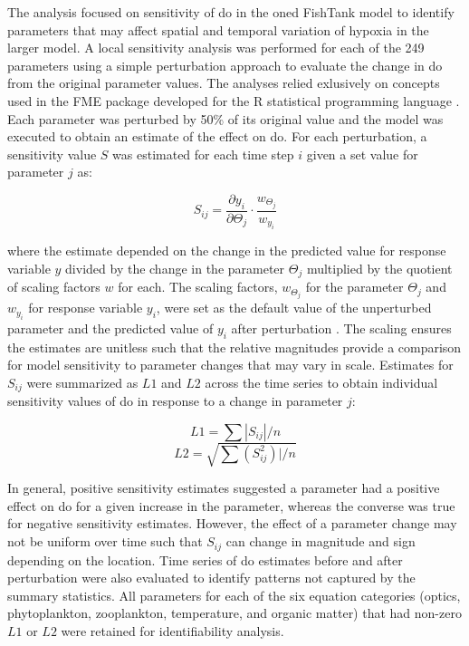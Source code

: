\documentclass[letterpaper,12pt,oneside]{article}\usepackage[]{graphicx}\usepackage[]{color}
\begin{document}
The analysis focused on sensitivity of \ac{do} in the \ac{oned} FishTank model to identify parameters that may affect spatial and temporal variation of hypoxia in the larger model.  A local sensitivity analysis was performed for each of the 249 parameters using a simple perturbation approach to evaluate the change in \ac{do} from the original parameter values.  The analyses relied exlusively on concepts used in the FME package developed for the R statistical programming language \citep{Soetaert10}. Each parameter was perturbed by 50\% of its original value and the model was executed to obtain an estimate of the effect on \ac{do}.  For each perturbation, a sensitivity value $S$ was estimated for each time step $i$ given a set value for parameter $j$ as:

\begin{equation} \label{sijeqn}
S_{ij} = \frac{\partial y_i}{\partial \Theta_j}\cdot\frac{w_{\Theta_j}}{w_{y_i}}
\end{equation}

\noindent where the estimate depended on the change in the predicted value for response variable $y$ divided by the change in the parameter $\Theta_j$ multiplied by the quotient of scaling factors $w$ for each.  The scaling factors, $w_{\Theta_j}$ for the parameter $\Theta_j$ and $w_{y_i}$ for response variable $y_i$, were set as the default value of the unperturbed parameter and the predicted value of $y_i$ after perturbation \citep{Soetaert10}.  The scaling ensures the estimates are unitless such that the relative magnitudes provide a comparison for model sensitivity to parameter changes that may vary in scale.  Estimates for $S_{ij}$ were summarized as $L1$ and $L2$ across the time series to obtain individual sensitivity values of \ac{do} in response to a change in parameter $j$:

\begin{equation} \label{l1}
L1 = \sum|S_{ij}|/n
\end{equation}
\begin{equation} \label{l2}
L2 = \sqrt{\sum\left(S_{ij}^2\right)|/n}
\end{equation}

In general, positive sensitivity estimates suggested a parameter had a positive effect on \ac{do} for a given increase in the parameter, whereas the converse was true for negative sensitivity estimates.  However, the effect of a parameter change may not be uniform over time such that $S_{ij}$ can change in magnitude and sign depending on the location.  Time series of \ac{do} estimates before and after perturbation were also evaluated to identify patterns not captured by the summary statistics. All parameters for each of the six equation categories (optics, phytoplankton, zooplankton, temperature, and organic matter) that had non-zero $L1$ or $L2$ were retained for identifiability analysis.  
\end{document}

